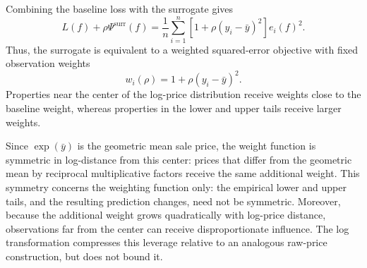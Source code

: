\documentclass[10pt]{article}
\theoremstyle{definition}
\newcommand{\1}{\mathbf{1}}
\begin{document}
Combining the baseline loss with the surrogate gives
\begin{equation}
\label{eq:surrogate_weighted_loss}
L(f)+\rho\Psi^{\mathrm{surr}}(f)
=
\frac{1}{n}\sum_{i=1}^n
\left[1+\rho(y_i-\bar y)^2\right]e_i(f)^2.
\end{equation}
Thus, the surrogate is equivalent to a weighted squared-error objective with fixed observation weights
\begin{equation}
\label{eq:surrogate_weights}
w_i(\rho)=1+\rho(y_i-\bar y)^2.
\end{equation}
Properties near the center of the log-price distribution receive weights close to the baseline weight, whereas properties in the lower and upper tails receive larger weights.




{Since $\exp(\bar y)$ is the geometric mean sale price, the weight function is symmetric in log-distance from this center: prices that differ from the geometric mean by reciprocal multiplicative factors receive the same additional weight. This symmetry concerns the weighting function only: the empirical lower and upper tails, and the resulting prediction changes, need not be symmetric. Moreover, because the additional weight grows quadratically with log-price distance, observations far from the center can receive disproportionate influence. The log transformation compresses this leverage relative to an analogous raw-price construction, but does not bound it.}
\end{document}
